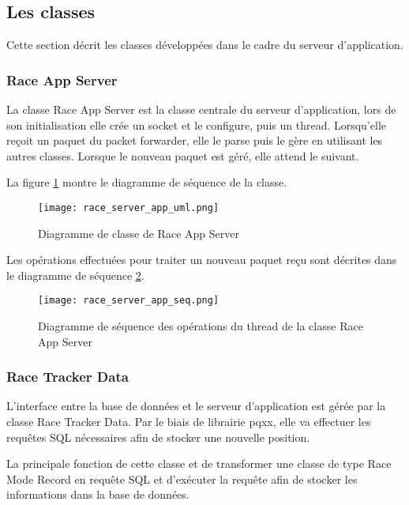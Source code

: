 \subsection{Les classes}

Cette section décrit les classes développées dans le cadre du serveur d'application.

\subsubsection{Race App Server}

La classe Race App Server est la classe centrale du serveur d'application, lors de son initialisation elle crée un socket et le configure, puis un thread. Lorsqu'elle reçoit un paquet du packet forwarder, elle le parse puis le gère en utilisant les autres classes. Lorsque le nouveau paquet est géré, elle attend le suivant.

La figure \ref{fig:race_app_server_uml} montre le diagramme de séquence de la classe.

\begin{figure}[htb]
\centering 
\texttt{[image: race\_server\_app\_uml.png]} 
\caption{Diagramme de classe de Race App Server}
\label{fig:race_app_server_uml}
\end{figure}

Les opérations effectuées pour traiter un nouveau paquet reçu sont décrites dans le diagramme de séquence \ref{fig:race_app_server_seq}.

\begin{figure}[htb]
\centering 
\texttt{[image: race\_server\_app\_seq.png]} 
\caption{Diagramme de séquence des opérations du thread de la classe Race App Server}
\label{fig:race_app_server_seq}
\end{figure}

\subsubsection{Race Tracker Data}

L'interface entre la base de données et le serveur d'application est gérée par la classe Race Tracker Data. Par le biais de librairie pqxx, elle va effectuer les requêtes SQL nécessaires afin de stocker une nouvelle position.

La principale fonction de cette classe et de transformer une classe de type Race Mode Record en requête SQL et d'exécuter la requête afin de stocker les informations dans la base de données.

